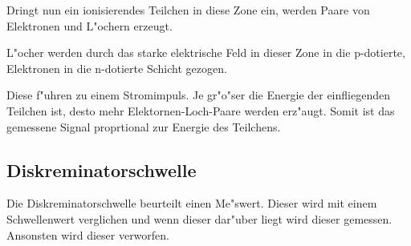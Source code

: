 Dringt nun ein ionisierendes Teilchen in diese Zone ein, werden Paare von Elektronen und L"ochern erzeugt.

L"ocher werden durch das starke elektrische Feld in dieser Zone in die p-dotierte, Elektronen in die n-dotierte Schicht gezogen.

Diese f"uhren zu einem Stromimpuls. Je gr"o"ser die Energie der einfliegenden Teilchen ist, desto mehr Elektornen-Loch-Paare werden erz"augt. Somit ist das gemessene Signal proprtional zur Energie des Teilchens.

\subsection{Diskreminatorschwelle} %
\label{sub:diskreminatorschwelle}

Die Diskreminatorschwelle beurteilt einen Me"swert. Dieser wird mit einem Schwellenwert verglichen und wenn dieser dar"uber liegt wird dieser gemessen. Ansonsten wird dieser verworfen.